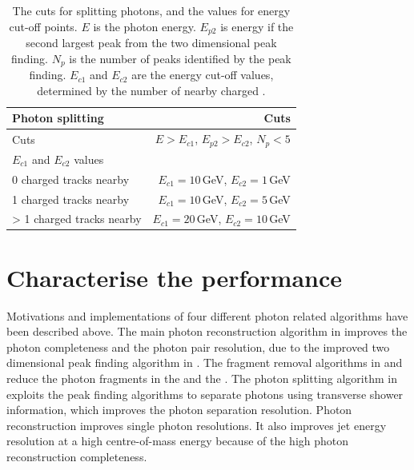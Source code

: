 \begin{table}[htbp]
\centering
\smallskip
\begin{tabular}{l r }
\hline
\hline
Photon splitting&  Cuts\\
\hline
\multicolumn{1}{L{0.3\textwidth}}{Cuts} & \multicolumn{1}{R{0.6\textwidth}}{$E > E_{c1}$, $E_{p2} > E_{c2}$, $N_{p} < 5$} \\
\hline
$E_{c1}$ and $E_{c2}$ values &  \\
\hline
\multicolumn{1}{L{0.3\textwidth}}{0 charged tracks nearby} & \multicolumn{1}{R{0.6\textwidth}}{$E_{c1} = 10$\,GeV, $E_{c2} = 1$\,GeV} \\
\multicolumn{1}{L{0.3\textwidth}}{1 charged tracks nearby} & \multicolumn{1}{R{0.6\textwidth}}{$E_{c1} = 10$\,GeV, $E_{c2} = 5$\,GeV} \\
\multicolumn{1}{L{0.3\textwidth}}{> 1 charged tracks nearby} & \multicolumn{1}{R{0.6\textwidth}}{$E_{c1} = 20$\,GeV, $E_{c2} = 10$\,GeV} \\
\hline
\hline
\end{tabular}

\caption[Cuts for splitting photons.]%
{The cuts for splitting photons, and the values for energy cut-off points. $E$ is the photon energy. $E_{p2}$ is  energy if the second largest peak from the two dimensional peak finding. $N_{p}$ is the number of peaks identified by the peak finding. $E_{c1}$ and $E_{c2}$ are the energy cut-off values, determined by the number of nearby charged .}
\label{tab:photonPhotonSplitting}
\end{table}

\section{Characterise the performance}


Motivations and implementations of four different photon related algorithms have been described above. The main photon reconstruction algorithm in  improves the photon completeness and the photon pair resolution, due to the improved two dimensional peak finding algorithm in . The fragment removal algorithms in  and  reduce the photon fragments in the \ECAL and the \HCAL. The photon splitting algorithm in  exploits the peak finding algorithms to separate photons using transverse shower information, which improves the photon separation resolution. Photon reconstruction improves single photon resolutions. It also improves jet energy resolution at a high centre-of-mass energy because of the high photon reconstruction completeness.

